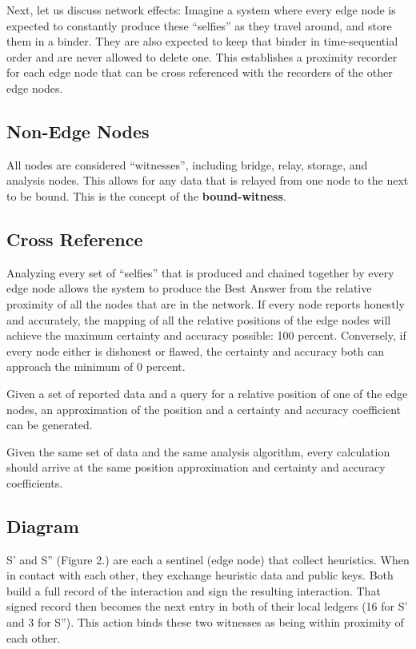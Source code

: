 \documentclass{article}
\begin{document}
Next, let us discuss network effects: Imagine a system where every edge node is expected to constantly produce these ``selfies'' as they travel around, and store them in a binder. They are also expected to keep that binder in time-sequential order and are never allowed to delete one. This establishes a proximity recorder for each edge node that can be cross referenced with the recorders of the other edge nodes.

\subsection {Non-Edge Nodes}
All nodes are considered ``witnesses'', including bridge, relay, storage, and analysis nodes. This allows for any data that is relayed from one node to the next to be bound. This is the concept of the \textbf{\Gls{bound-witness}}.

\subsection {Cross Reference}
Analyzing every set of ``selfies'' that is produced and chained together by every edge node allows the system to produce the Best Answer from the relative proximity of all the nodes that are in the network. If every node reports honestly and accurately, the mapping of all the relative positions of the edge nodes will achieve the maximum \gls{certainty} and \gls{accuracy} possible: 100 percent. Conversely, if every node either is dishonest or flawed, the certainty and accuracy both can approach the minimum of 0 percent.

Given a set of reported data and a query for a relative position of one of the edge nodes, an approximation of the position and a certainty and accuracy coefficient can be generated.

Given the same set of data and the same analysis algorithm, every calculation should arrive at the same position approximation and certainty and accuracy coefficients.

\subsection {Diagram}
S' and S'' (Figure 2.) are each a \Gls{sentinel} (edge node) that collect \glspl{heuristic}. When in contact with each other, they exchange heuristic data and public keys. Both build a full record of the interaction and sign the resulting interaction. That signed record then becomes the next entry in both of their local ledgers (16 for S' and 3 for S''). This action binds these two witnesses as being within proximity of each other.
\end{document}
